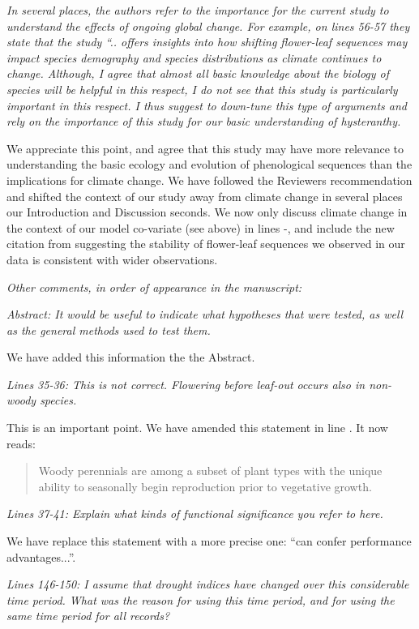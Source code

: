 \documentclass{article}[12pt]
\begin{document}
\emph{In several places, the authors refer to the importance for the current study to understand the effects of ongoing global change. For example, on lines 56-57 they state that the study “.. offers insights into how shifting flower-leaf sequences may impact species demography and species distributions as climate continues to change. Although, I agree that almost all basic knowledge about the biology of species will be helpful in this respect, I do not see that this study is particularly important in this respect. I thus suggest to down-tune this type of arguments and rely on the importance of this study for our basic understanding of hysteranthy.}

We appreciate this point, and agree that this study may have more relevance to understanding the basic ecology and evolution of phenological sequences than the implications for climate change. We have followed the Reviewers recommendation and shifted the context of our study away from climate change in several places our Introduction and Discussion seconds. We now only discuss climate change in the context of our model co-variate (see above) in lines -, and include the new citation from \citet{Guo:2023wb} suggesting the stability of flower-leaf sequences we observed in our data is consistent with wider observations.

\emph{Other comments, in order of appearance in the manuscript:}

\emph{Abstract: It would be useful to indicate what hypotheses that were tested, as well as the general methods used to test them.}

We have added this information the the Abstract.

\emph{Lines 35-36: This is not correct. Flowering before leaf-out occurs also in non-woody species.}

This is an important point. We have amended this statement in line . It now reads:
\begin{quote} Woody perennials are among a subset of plant types with the unique ability to seasonally begin reproduction prior to vegetative growth.\end{quote}

\emph{Lines 37-41: Explain what kinds of functional significance you refer to here.}

We have replace this statement with a more precise one: ``can confer performance advantages...''.

\emph{Lines 146-150: I assume that drought indices have changed over this considerable time period. What was the reason for using this time period, and for using the same time period for all records?}
\end{document}
